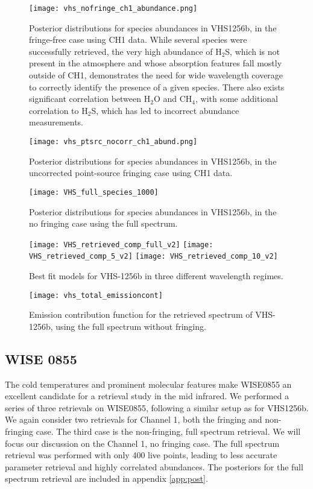 \begin{figure}[t]
	\centering
	\texttt{[image: vhs\_nofringe\_ch1\_abundance.png]}
	\caption{Posterior distributions for species abundances in VHS1256b, in the fringe-free case using CH1 data. While several species were successfully retrieved, the very high abundance of H$_{2}$S, which is not present in the atmosphere and whose absorption features fall mostly outside of CH1, demonstrates the need for wide wavelength coverage to correctly identify the presence of a given species. There also exists significant correlation between H$_{2}$O and CH$_{4}$, with some additional correlation to H$_{2}$S, which has led to incorrect abundance measurements.}
	\label{fig:postVHS_abundances}
\end{figure}
\begin{figure}
	\centering
	\texttt{[image: vhs\_ptsrc\_nocorr\_ch1\_abund.png]}
	\caption{Posterior distributions for species abundances in VHS1256b, in the uncorrected point-source fringing case using CH1 data.}
	\label{fig:postVHS_abundances_fringe}
\end{figure}
\begin{figure}
	\centering
	\texttt{[image: VHS\_full\_species\_1000]}
	\caption{Posterior distributions for species abundances in VHS1256b, in the no fringing case using the full spectrum. }
	\label{fig:postVHS_abundances_full}
\end{figure}

\begin{figure}[h]
	\centering
	\texttt{[image: VHS\_retrieved\_comp\_full\_v2]}
	\texttt{[image: VHS\_retrieved\_comp\_5\_v2]}
	\texttt{[image: VHS\_retrieved\_comp\_10\_v2]}
	\caption{Best fit models for VHS-1256b in three different wavelength regimes.}
	\label{fig:bestfitVHS}
\end{figure}
\begin{figure}[h]
	\texttt{[image: vhs\_total\_emissioncont]}
	\caption{Emission contribution function for the retrieved spectrum of VHS-1256b, using the full spectrum without fringing.}
	\label{fig:VHSemcont}
\end{figure}
\clearpage
\subsection{WISE 0855}
The cold temperatures and prominent molecular features make WISE0855 an excellent candidate for a retrieval study in the mid infrared.
We performed a series of three retrievals on WISE0855, following a similar setup as for VHS1256b.
We again consider two retrievals for Channel 1, both the fringing and non-fringing case.
The third case is the non-fringing, full spectrum retrieval.
We will focus our discussion on the Channel 1, no fringing case.
The full spectrum retrieval was performed with only 400 live points, leading to less accurate parameter retrieval and highly correlated abundances.
The posteriors for the full spectrum retrieval are included in appendix \ref{app:post}.

